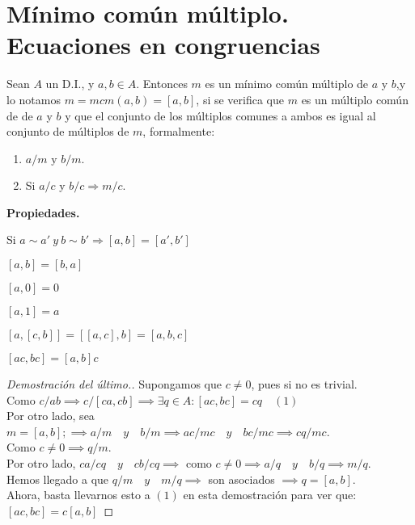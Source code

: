 \section{Mínimo común múltiplo. Ecuaciones en congruencias}
\begin{ndef}
	Sean $A$ un D.I., y $a, b \in A$. Entonces $m$ es un mínimo común múltiplo de $a$ y $b$,y lo notamos $m = mcm(a,b) = [a,b]$,
si se verifica que $m$ es un múltiplo común de de $a$ y $b$ y que el conjunto de los múltiplos comunes a ambos es igual al conjunto de múltiplos de $m$, formalmente:
\begin{enumerate}
\item $a/m \text{ y } b/m$.
\item Si $a/c$ y $b/c \Rightarrow m/c$.
\end{enumerate}

\textbf{Propiedades. }
\begin{nlist}
\item Si $a\sim a' \ y \ b\sim b' \Rightarrow [a,b]=[a',b']$
\item $[a,b] = [b,a]$
\item $[a,0] = 0$
\item $[a,1] = a$
\item $[a,[c,b]]= [[a,c],b] = [a,b,c]$
\item $[ac,bc] =[a,b]c$\\

\begin{proof}[Demostración del último.]

	Supongamos que $c\ne 0$, pues si no es trivial.\\
	Como $c/ab\implies c/[ca,cb] \implies \exists q \in A : [ac,bc] = cq\quad (1)$\\
	Por otro lado, sea $m = [a,b]; \implies a/m \quad y \quad b/m \implies ac/mc \quad y \quad bc/mc \implies cq/mc$.\\
	Como $c\ne 0 \implies q/m$.\\
	Por otro lado, $ca/cq \quad y \quad cb/cq \implies$ como $c\ne 0 \implies a/q \quad y \quad b/q \implies m/q.$\\
	Hemos llegado a que $q/m \quad y \quad m/q \implies $ son asociados $\implies q=[a,b]$.\\
	Ahora, basta llevarnos esto a $(1)$ en esta demostración para ver que:\\ $[ac,bc] = c[a,b]$
\end{proof}
\end{nlist}
\end{ndef}


